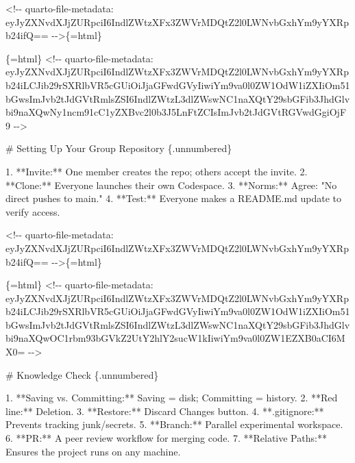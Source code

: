 \documentclass[
  letterpaper,
  DIV=11,
  numbers=noendperiod,
  oneside]{scrreprt}
\newenvironment{Shaded}{\begin{snugshade}}{\end{snugshade}}
\newcommand{\FunctionTok}[1]{\textcolor[rgb]{0.28,0.35,0.67}{#1}}
\newcommand{\InformationTok}[1]{\textcolor[rgb]{0.37,0.37,0.37}{#1}}
\newcommand{\NormalTok}[1]{\textcolor[rgb]{0.00,0.23,0.31}{#1}}
\newcommand{\SpecialStringTok}[1]{\textcolor[rgb]{0.13,0.47,0.30}{#1}}
\begin{document}
\begin{Shaded}
\begin{Highlighting}[numbers=left,,]
\InformationTok{\textasciigrave{}\textless{}!{-}{-} quarto{-}file{-}metadata: eyJyZXNvdXJjZURpciI6IndlZWtzXFx3ZWVrMDQtZ2l0LWNvbGxhYm9yYXRpb24ifQ== {-}{-}\textgreater{}\textasciigrave{}}\NormalTok{\{=html\}}

\InformationTok{\textasciigrave{}\textasciigrave{}\textasciigrave{}\{=html\}}
\InformationTok{\textless{}!{-}{-} quarto{-}file{-}metadata: eyJyZXNvdXJjZURpciI6IndlZWtzXFx3ZWVrMDQtZ2l0LWNvbGxhYm9yYXRpb24iLCJib29rSXRlbVR5cGUiOiJjaGFwdGVyIiwiYm9va0l0ZW1OdW1iZXIiOm51bGwsImJvb2tJdGVtRmlsZSI6IndlZWtzL3dlZWswNC1naXQtY29sbGFib3JhdGlvbi9naXQwNy1ncm91cC1yZXBvc2l0b3J5LnFtZCIsImJvb2tJdGVtRGVwdGgiOjF9 {-}{-}\textgreater{}}
\InformationTok{\textasciigrave{}\textasciigrave{}\textasciigrave{}}

\FunctionTok{\# Setting Up Your Group Repository \{.unnumbered\}}


\SpecialStringTok{1.  }\NormalTok{**Invite:** One member creates the repo; others accept the invite.}
\SpecialStringTok{2.  }\NormalTok{**Clone:** Everyone launches their own Codespace.}
\SpecialStringTok{3.  }\NormalTok{**Norms:** Agree: "No direct pushes to }\InformationTok{\textasciigrave{}main\textasciigrave{}}\NormalTok{."}
\SpecialStringTok{4.  }\NormalTok{**Test:** Everyone makes a }\InformationTok{\textasciigrave{}README.md\textasciigrave{}}\NormalTok{ update to verify access.}


\InformationTok{\textasciigrave{}\textless{}!{-}{-} quarto{-}file{-}metadata: eyJyZXNvdXJjZURpciI6IndlZWtzXFx3ZWVrMDQtZ2l0LWNvbGxhYm9yYXRpb24ifQ== {-}{-}\textgreater{}\textasciigrave{}}\NormalTok{\{=html\}}

\InformationTok{\textasciigrave{}\textasciigrave{}\textasciigrave{}\{=html\}}
\InformationTok{\textless{}!{-}{-} quarto{-}file{-}metadata: eyJyZXNvdXJjZURpciI6IndlZWtzXFx3ZWVrMDQtZ2l0LWNvbGxhYm9yYXRpb24iLCJib29rSXRlbVR5cGUiOiJjaGFwdGVyIiwiYm9va0l0ZW1OdW1iZXIiOm51bGwsImJvb2tJdGVtRmlsZSI6IndlZWtzL3dlZWswNC1naXQtY29sbGFib3JhdGlvbi9naXQwOC1rbm93bGVkZ2UtY2hlY2sucW1kIiwiYm9va0l0ZW1EZXB0aCI6MX0= {-}{-}\textgreater{}}
\InformationTok{\textasciigrave{}\textasciigrave{}\textasciigrave{}}

\FunctionTok{\# Knowledge Check \{.unnumbered\}}


\SpecialStringTok{1.  }\NormalTok{**Saving vs. Committing:** Saving = disk; Committing = history.}
\SpecialStringTok{2.  }\NormalTok{**Red line:** Deletion.}
\SpecialStringTok{3.  }\NormalTok{**Restore:** Discard Changes button.}
\SpecialStringTok{4.  }\NormalTok{**.gitignore:** Prevents tracking junk/secrets.}
\SpecialStringTok{5.  }\NormalTok{**Branch:** Parallel experimental workspace.}
\SpecialStringTok{6.  }\NormalTok{**PR:** A peer review workflow for merging code.}
\SpecialStringTok{7.  }\NormalTok{**Relative Paths:** Ensures the project runs on any machine.}


\end{Highlighting}
\end{Shaded}
\end{document}
